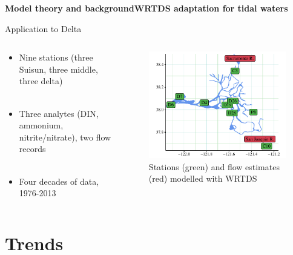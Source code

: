 \documentclass[serif]{beamer}\usepackage[]{graphicx}\usepackage[]{color}
\begin{document}
 
\begin{frame}{\textbf{Model theory and background}}{\textbf{WRTDS adaptation for tidal waters}} 
{\bf \centerline{Application to Delta}}
\begin{columns}
\begin{column}{0.45\textwidth}
\begin{itemize}
\item Nine stations (three Suisun, three middle, three delta) \\~\\
\item Three analytes (DIN, ammonium, nitrite/nitrate), two flow records \\~\\
\item Four decades of data, 1976-2013
\end{itemize}
\end{column}
\begin{column}{0.5\textwidth}
\begin{figure}
\begin{center}
\includegraphics[width = \textwidth]{fig/stations.pdf}
\caption{Stations (green) and flow estimates (red) modelled with WRTDS}
\end{center}
\end{figure}
\end{column}
\end{columns}
\end{frame}

\section{Trends}
\end{document}
